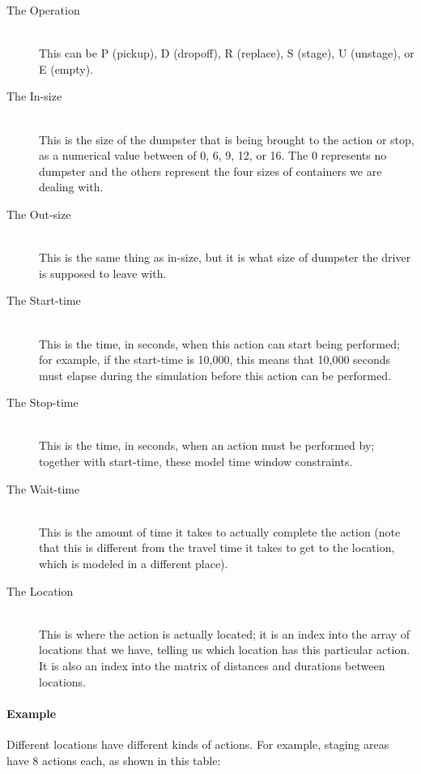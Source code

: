 \documentclass{article}
\begin{document}
\begin{description}
\item[The Operation ] \hfill \\
 This can be P (pickup), D (dropoff), R (replace), S (stage), U (unstage), or E (empty).
\item[The In-size   ] \hfill \\
 This is the size of the dumpster that is being brought to the action or stop, as a numerical value between of 0, 6, 9, 12, or 16.
The 0 represents no dumpster and the others represent the four sizes of containers we are dealing with.
\item[The Out-size  ] \hfill \\
 This is the same thing as in-size, but it is what size of dumpster the driver is supposed to leave with.
\item[The Start-time] \hfill \\
 This is the time, in seconds, when this action can start being performed; for example, if the start-time is 10,000, this means that 10,000 seconds must elapse during the simulation before this action can be performed.
\item[The Stop-time ] \hfill \\
 This is the time, in seconds, when an action must be performed by; together with start-time, these model time window constraints.
\item[The Wait-time ] \hfill \\
This is the amount of time it takes to actually complete the action (note that this is different from the travel time it takes to get to the location, which is modeled in a different place).
\item[The Location  ] \hfill \\
This is where the action is actually located; it is an index into the array of locations that we have, telling us which location has this particular action.
 It is also an index into the matrix of distances and durations between locations.
\end{description}


\paragraph{Example}

Different locations have different kinds of actions.
For example, staging areas have 8 actions each, as shown in this table:
\end{document}
